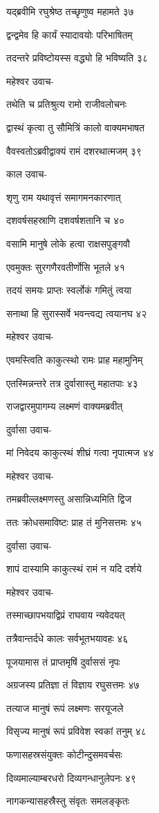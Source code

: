 यद्ब्रवीमि रघुश्रेष्ठ तच्छृणुष्व महामते ३७

द्वन्द्वमेव हि कार्यं स्यादावयोः परिभाषितम्

तदन्तरे प्रविष्टोयस्स वद्ध्यो हि भविष्यति ३८

महेश्वर उवाच-

तथेति च प्रतिश्रुत्य रामो राजीवलोचनः

द्वास्थं कृत्वा तु सौमित्रिं कालो वाक्यमभाषत

वैवस्वतोऽब्रवीद्वाक्यं रामं दशरथात्मजम् ३९

काल उवाच-

शृणु राम यथावृत्तं समागमनकारणात्

दशवर्षसहस्राणि दशवर्षशतानि च ४०

वसामि मानुषे लोके हत्वा राक्षसपुङ्गवौ

एवमुक्तः सुरगणैरवतीर्णोसि भूतले ४१

तदयं समयः प्राप्तः स्वर्लोकं गमितुं त्वया

सनाथा हि सुरास्सर्वे भवन्त्वद्य त्वयानघ ४२

महेश्वर उवाच-

एवमस्त्विति काकुत्स्थो रामः प्राह महामुनिम्

एतस्मिन्नन्तरे तत्र दुर्वासास्तु महातपाः ४३

राजद्वारमुपागम्य लक्ष्मणं वाक्यमब्रवीत्

दुर्वासा उवाच-

मां निवेदय काकुत्स्थं शीघ्रं गत्वा नृपात्मज ४४

महेश्वर उवाच-

तमब्रवील्लक्ष्मणस्तु असान्निध्यमिति द्विज

ततः क्रोधसमाविष्टः प्राह तं मुनिसत्तमः ४५

दुर्वासा उवाच-

शापं दास्यामि काकुत्स्थं रामं न यदि दर्शये

महेश्वर उवाच-

तस्माच्छापभयाद्विप्रं राघवाय न्यवेदयत्

तत्रैवान्तर्दधे कालः सर्वभूतभयावहः ४६

पूजयामास तं प्राप्तमृषिं दुर्वाससं नृपः

अग्रजस्य प्रतिज्ञा तं विज्ञाय रघुसत्तमः ४७

तत्याज मानुषं रूपं लक्ष्मणः सरयूजले

विसृज्य मानुषं रूपं प्रविवेश स्वकां तनुम् ४८

फणासहस्रसंयुक्तः कोटीन्दुसमवर्चसः

दिव्यमाल्याम्बरधरो दिव्यगन्धानुलेपनः ४९

नागकन्यासहस्रैस्तु संवृतः समलङ्कृतः

